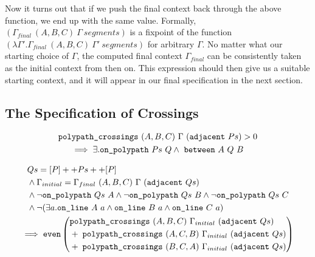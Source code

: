 Now it turns out that if we push the final context back through the above function, we end up with the same value. Formally, $(\Gamma_{final}\ (A,B,C)\ \Gamma\ segments)$ is a fixpoint of the function $(\lambda \Gamma'. \Gamma_{final}\ (A,B,C)\ \Gamma'\ segments)$ for arbitrary $\Gamma$. No matter what our starting choice of $\Gamma$, the computed final context $\Gamma_{final}$ can be consistently taken as the initial context from then on. This expression should then give us a suitable starting context, and it will appear in our final specification in the next section.

\subsection{The Specification of Crossings}
\begin{boxedfigure}
  \begin{multline}\label{eq:crossNZIntersect}
    \texttt{polypath\_crossings}\ (A,B,C)\ \Gamma\ (\texttt{adjacent}\ Ps) > 0\\
    \implies \exists. \texttt{on\_polypath}\ Ps\ Q \wedge\ \texttt{between}\ A\ Q\ B
  \end{multline}

  \begin{multline}\label{eq:polypathCrossingsEven}
  \begin{aligned}
    &Qs = [P] ++ Ps ++ [P]\\
    &\wedge \Gamma_{initial} = \Gamma_{final}\ (A,B,C)\ \Gamma\ (\texttt{adjacent}\ Qs)\\
    &\wedge \neg\texttt{on\_polypath}\ Qs\ A \wedge \neg\texttt{on\_polypath}\ Qs\ B \wedge \neg\texttt{on\_polypath}\ Qs\ C\\
    &\wedge \neg(\exists a.\texttt{on\_line}\ A\ a\wedge \texttt{on\_line}\ B\ a\wedge \texttt{on\_line}\ C\ a)
\end{aligned}\\
\implies\texttt{even}\left(\begin{aligned}& \texttt{polypath\_crossings}\ (A,B,C)\ \Gamma_{initial}\ (\texttt{adjacent}\ Qs)\\
    &+\;\texttt{polypath\_crossings}\ (A,C,B)\ \Gamma_{initial}\ (\texttt{adjacent}\ Qs)\\
    &+\;\texttt{polypath\_crossings}\ (B,C,A)\ \Gamma_{initial}\ (\texttt{adjacent}\ Qs)
  \end{aligned}\right)
\end{multline}


\end{boxedfigure}
